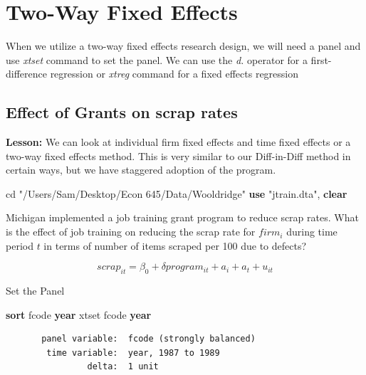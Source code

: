\documentclass[
]{book}
\newenvironment{Shaded}{\begin{snugshade}}{\end{snugshade}}
\newcommand{\FunctionTok}[1]{\textcolor[rgb]{0.13,0.29,0.53}{\textbf{#1}}}
\newcommand{\KeywordTok}[1]{\textcolor[rgb]{0.13,0.29,0.53}{\textbf{#1}}}
\newcommand{\NormalTok}[1]{#1}
\newcommand{\StringTok}[1]{\textcolor[rgb]{0.31,0.60,0.02}{#1}}
\begin{document}
\section{Two-Way Fixed Effects}\label{two-way-fixed-effects}

When we utilize a two-way fixed effects research design, we will need a panel and use \emph{xtset} command to set the panel. We can use the \emph{d.} operator for a first-difference regression or \emph{xtreg} command for a fixed effects regression

\subsection{Effect of Grants on scrap rates}\label{effect-of-grants-on-scrap-rates}

\textbf{Lesson:} We can look at individual firm fixed effects and time fixed effects or a two-way fixed effects method. This is very similar to our Diff-in-Diff method in certain ways, but we have staggered adoption of the program.

\begin{Shaded}
\begin{Highlighting}[]
\NormalTok{cd }\StringTok{"/Users/Sam/Desktop/Econ 645/Data/Wooldridge"}
\KeywordTok{use} \StringTok{"jtrain.dta"}\NormalTok{, }\KeywordTok{clear}
\end{Highlighting}
\end{Shaded}

Michigan implemented a job training grant program to reduce scrap rates. What is the effect of job training on reducing the scrap rate for \(firm_i\) during time period \(t\) in terms of number of items scraped per 100 due to
defects?

\[ scrap_{it} = \beta_0 + \delta program_{it} + a_{i} + a_{t} + u_{it} \]

Set the Panel

\begin{Shaded}
\begin{Highlighting}[]
\KeywordTok{sort}\NormalTok{ fcode }\FunctionTok{year}
\NormalTok{xtset fcode }\FunctionTok{year}
\end{Highlighting}
\end{Shaded}

\begin{verbatim}
       panel variable:  fcode (strongly balanced)
        time variable:  year, 1987 to 1989
                delta:  1 unit
\end{verbatim}
\end{document}
